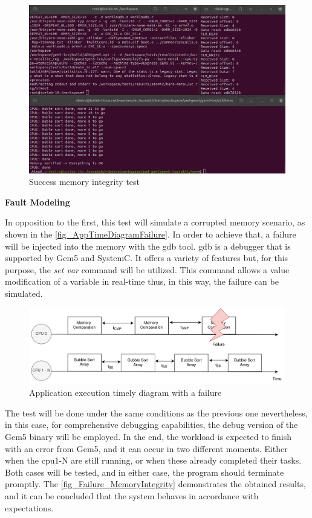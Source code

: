 \begin{figure}[H]
	\centering
 	\includegraphics[width=0.8\linewidth]{Images/Success_MemoryIntegrity.png} 
 	\caption{Success memory integrity test}
\end{figure}


\textbf{Fault Modeling}
\newline

In opposition to the first, this test will simulate a corrupted memory scenario, as shown in the \autoref{fig_AppTimeDiagramFailure}. 
In order to achieve that, a failure will be injected into the memory with the \gls{gdb} tool. \gls{gdb} is a debugger 
that is supported by Gem5 and SystemC. It offers a variety of features but, for this purpose, the \textit{set var} \space command will be utilized. 
This command allows a value modification of a variable in real-time thus, in this way, the failure can be simulated.

\begin{figure}[H]
	\centering
 	\includegraphics[width=0.8\linewidth]{Images/AppTimeDiagramFailure.png}
 	\caption{Application execution timely diagram with a failure}
	 \label{fig_AppTimeDiagramFailure}
\end{figure}


The test will be done under the same conditions as the previous one nevertheless, in this case, for comprehensive debugging capabilities, 
the debug version of the Gem5 binary will be employed. In the end, the workload is expected to finish with an error from Gem5, and it can occur 
in two different moments. Either when the \gls{cpu}1-N are still running, or when these already completed their tasks. Both cases  
will be tested, and in either case, the program should terminate promptly. The \autoref{fig_Failure_MemoryIntegrity} demonstrates the obtained 
results, and it can be concluded that the system behaves in accordance with expectations.

